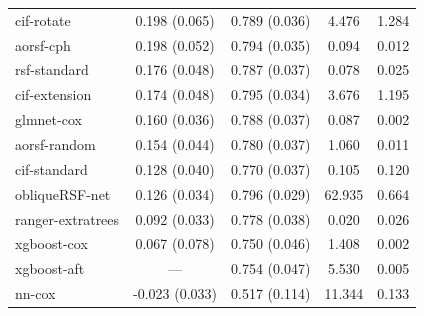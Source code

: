\documentclass{article}\usepackage[]{graphicx}\usepackage[]{xcolor}
\newenvironment{knitrout}{}{} %
\begin{document}
\begin{knitrout}
\begin{longtable}[t]{lcccc}
\hspace{1em}cif-rotate & 0.198 (0.065) & 0.789 (0.036) & 4.476 & 1.284\\
\hspace{1em}aorsf-cph & 0.198 (0.052) & 0.794 (0.035) & 0.094 & 0.012\\
\hspace{1em}rsf-standard & 0.176 (0.048) & 0.787 (0.037) & 0.078 & 0.025\\
\hspace{1em}cif-extension & 0.174 (0.048) & 0.795 (0.034) & 3.676 & 1.195\\
\hspace{1em}glmnet-cox & 0.160 (0.036) & 0.788 (0.037) & 0.087 & 0.002\\
\hspace{1em}aorsf-random & 0.154 (0.044) & 0.780 (0.037) & 1.060 & 0.011\\
\hspace{1em}cif-standard & 0.128 (0.040) & 0.770 (0.037) & 0.105 & 0.120\\
\hspace{1em}obliqueRSF-net & 0.126 (0.034) & 0.796 (0.029) & 62.935 & 0.664\\
\hspace{1em}ranger-extratrees & 0.092 (0.033) & 0.778 (0.038) & 0.020 & 0.026\\
\hspace{1em}xgboost-cox & 0.067 (0.078) & 0.750 (0.046) & 1.408 & 0.002\\
\hspace{1em}xgboost-aft & --- & 0.754 (0.047) & 5.530 & 0.005\\
\hspace{1em}nn-cox & -0.023 (0.033) & 0.517 (0.114) & 11.344 & 0.133\\*
\end{longtable}

\end{knitrout}
\end{document}
